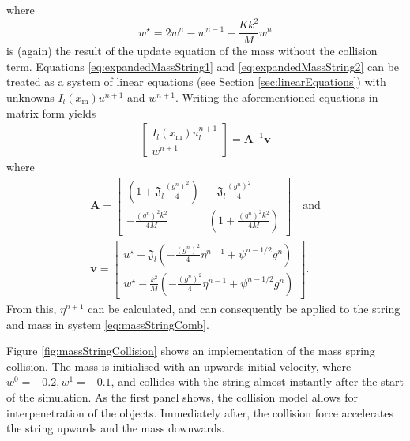 where 
\begin{equation*}
    w^\star = 2w^n - w^{n-1} - \frac{Kk^2}{M}w^n
\end{equation*}
is (again) the result of the update equation of the mass without the collision term.
Equations \eqref{eq:expandedMassString1} and \eqref{eq:expandedMassString2} can be treated as a system of linear equations (see Section \ref{sec:linearEquations}) with unknowns $I_l(x_\text{m})u^{n+1}$ and $w^{n+1}$. Writing the aforementioned equations in matrix form yields
\begin{align}
    \begin{bmatrix}
            I_l(x_\text{m})u^{n+1}_l\\
            w^{n+1}
        \end{bmatrix}
        = 
        \mathbf{A}^{-1}\mathbf{v}
    \end{align}
    where
    \begin{equation}
    \begin{gathered}
    \mathbf{A} = 
        \begin{bmatrix}
            \left(1 + \mathfrak{J}_l\frac{(g^n)^2}{4}\right) & -\mathfrak{J}_l\frac{(g^n)^2}{4}\\
            -\frac{(g^n)^2 k^2}{4M} &\left(1 + \frac{(g^n)^2 k^2}{4M}\right)
        \end{bmatrix}
        \quad \text{and}\\
        \mathbf{v} = 
        \begin{bmatrix}
            u^\star + \mathfrak{J}_l \left(-\frac{(g^n)^2}{4}\eta^{n-1} + \psi^{n-1/2}g^n\right)\\
            w^\star- \frac{k^2}{M} \left(-\frac{(g^n)^2}{4}\eta^{n-1} + \psi^{n-1/2}g^n\right)
        \end{bmatrix}.
        \nonumber
    \end{gathered}
\end{equation}
From this, $\eta^{n+1}$ can be calculated, and can consequently be applied to the string and mass in system \eqref{eq:massStringComb}.

Figure \ref{fig:massStringCollision} shows an implementation of the mass spring collision. The mass is initialised with an upwards initial velocity, where $w^0 = -0.2, w^1 = -0.1$, and collides with the string almost instantly after the start of the simulation. As the first panel shows, the collision model allows for interpenetration of the objects. Immediately after, the collision force accelerates the string upwards and the mass downwards.

